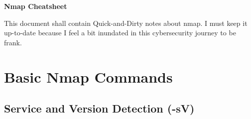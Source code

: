 \documentclass[11pt,a4paper]{article}
\begin{document}
\begin{center}
  \begin{tcolorbox}[width=\textwidth, colback=sectioncolor!20,
    colframe=sectioncolor]
    \centering
    {\Huge \textbf{Nmap Cheatsheet}}\\[0.5em]
  \end{tcolorbox}
\end{center}

\tableofcontents
\clearpage

\vspace{1em}
\begin{tcolorbox}[colback=codebackground, colframe=warningcolor]
  This document shall contain Quick-and-Dirty notes about
  nmap. I must keep it up-to-date because I feel a bit inundated in
  this cybersecurity journey to be frank.
\end{tcolorbox}

\section{Basic Nmap Commands}

\subsection{Service and Version Detection (-sV)}
\end{document}
